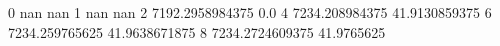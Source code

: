 0 nan nan
1 nan nan
2 7192.2958984375 0.0
4 7234.208984375 41.9130859375
6 7234.259765625 41.9638671875
8 7234.2724609375 41.9765625
